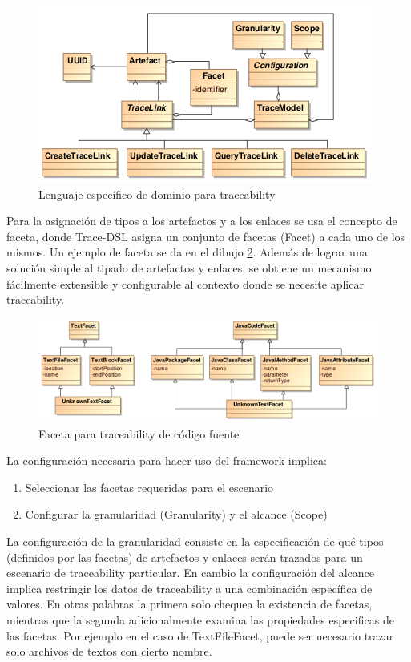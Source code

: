 \documentclass[a4paper,12pt,oneside]{book}
\begin{document}
\begin{figure}[hbtp]
\centering
\includegraphics[scale=.8]{./img/Trace-DSL}
\caption{Lenguaje específico de dominio para traceability}
\label{fig:DSLTrace}
\end{figure}

Para la asignación de tipos a los artefactos y a los enlaces se usa el concepto de faceta, donde Trace-DSL asigna un conjunto de facetas (Facet) a cada uno de los mismos. Un ejemplo de faceta se da en el dibujo \ref{fig:FacetaCodigoFuente}. Además de lograr una solución simple al tipado de artefactos y enlaces, se obtiene un mecanismo fácilmente extensible y configurable al contexto donde se necesite aplicar traceability.

\begin{figure}[hbtp]
\centering
\includegraphics[scale=.72]{./img/Faceta}
\caption{Faceta para traceability de código fuente}
\label{fig:FacetaCodigoFuente}
\end{figure}

La configuración necesaria para hacer uso del framework implica:

\begin{enumerate}
\item    Seleccionar las facetas requeridas para el escenario
\item    Configurar la granularidad (Granularity) y el alcance (Scope)
\end{enumerate}

La configuración de la granularidad consiste en la especificación de qué tipos (definidos por las facetas) de artefactos y enlaces serán trazados para un escenario de traceability particular. En cambio la configuración del alcance implica restringir los datos de traceability a una combinación específica de valores. En otras palabras la primera solo chequea la existencia de facetas, mientras que la segunda adicionalmente examina las propiedades especificas de las facetas. Por ejemplo en el caso de TextFileFacet, puede ser necesario trazar solo archivos de textos con cierto nombre.
\end{document}
